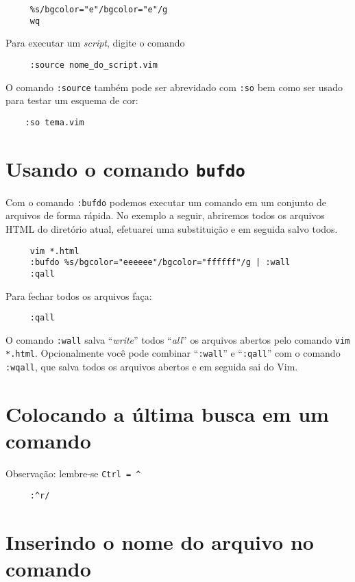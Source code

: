 \begin{verbatim}
     %s/bgcolor="e"/bgcolor="e"/g
     wq
\end{verbatim}

Para executar um {\em script}, digite o comando

\begin{verbatim}
     :source nome_do_script.vim
\end{verbatim}

O comando {\tt :source} também pode ser abrevidado com {\tt :so}
bem como ser usado para testar um esquema de cor:

\begin{verbatim}
    :so tema.vim
\end{verbatim}

\section{Usando o comando {\tt bufdo}}\label{Usando o comando bufdo}

Com o comando {\tt :bufdo} podemos executar um comando em um
conjunto de arquivos de forma rápida. No exemplo a seguir, abriremos
todos os arquivos HTML do diretório atual, efetuarei uma substituição
e em seguida salvo todos.

\begin{verbatim}
     vim *.html
     :bufdo %s/bgcolor="eeeeee"/bgcolor="ffffff"/g | :wall
     :qall
\end{verbatim}

Para fechar todos os arquivos faça:

\begin{verbatim}
     :qall
\end{verbatim}

O comando {\tt :wall} salva ``{\em write}'' todos ``{\em all}'' os arquivos
abertos pelo comando {\tt vim *.html}. Opcionalmente você pode
combinar ``{\tt :wall}'' e ``{\tt :qall}'' com o comando {\tt :wqall}, que
salva todos os arquivos abertos e em seguida sai do Vim.

\section{Colocando a última busca em um comando }
Observação: lembre-se \verb|Ctrl = ^|

\begin{verbatim}
     :^r/
\end{verbatim}

\section{Inserindo o nome do arquivo no comando }

